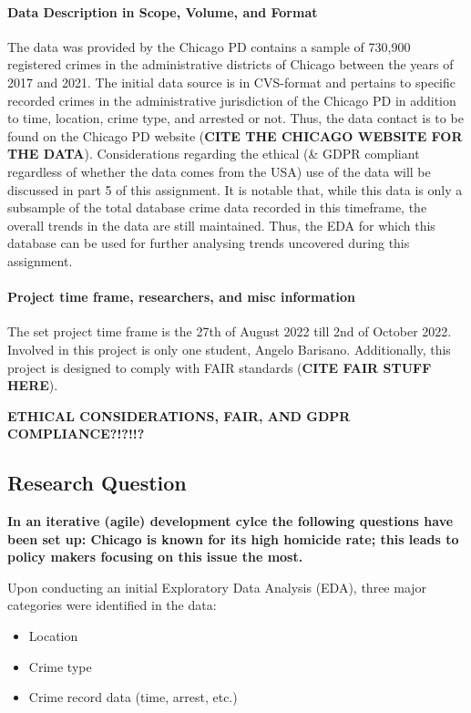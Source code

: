\documentclass[a4paper]{article}
\begin{document}
\paragraph{Data Description in Scope, Volume, and Format}
The data was provided by the Chicago PD contains a sample of 730,900 registered crimes in the administrative districts of Chicago between the years of 2017 and 2021. The initial data source is in CVS-format and pertains to specific recorded crimes in the administrative jurisdiction of the Chicago PD in addition to time, location, crime type, and arrested or not. Thus, the data contact is to be found on the Chicago PD website (\textbf{CITE THE CHICAGO WEBSITE FOR THE DATA}). Considerations regarding the ethical (\& GDPR compliant regardless of whether the data comes from the USA) use of the data will be discussed in part 5 of this assignment. It is notable that, while this data is only a subsample of the total database crime data recorded in this timeframe, the overall trends in the data are still maintained. Thus, the EDA for which this database can be used for further analysing trends uncovered during this assignment. 

\paragraph{Project time frame, researchers, and misc information} The set project time frame is the 27th of August 2022 till 2nd of October 2022. Involved in this project is only one student, Angelo Barisano. Additionally, this project is designed to comply with FAIR standards (\textbf{CITE FAIR STUFF HERE}).


\textbf{ETHICAL CONSIDERATIONS, FAIR, AND GDPR COMPLIANCE?!?!!?}



\subsection{Research Question}

\textbf{In an iterative (agile) development cylce the following questions have been set up: Chicago is known for its high homicide rate; this leads to policy makers focusing on this issue the most. }

Upon conducting an initial Exploratory Data Analysis (EDA), three major categories were identified in the data: 

\begin{itemize}
  \item Location
  \item Crime type
  \item Crime record data (time, arrest, etc.)
\end{itemize}
\end{document}
